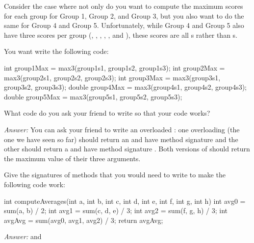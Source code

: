 \begin{example}
Consider the case where not only do you
want to compute the maximum scores for each group
for Group 1, Group 2, and Group 3, but you
also want to do the same for Group 4 and Group 5.
Unfortunately, while Group 4 and Group 5 also have
three scores per group (, ,
, , ,
and ), these scores are all s
rather than s.

You want write the following code:
\begin{code}
int group1Max = max3(group1s1, group1s2, group1s3);
int group2Max = max3(group2s1, group2s2, group2s3);
int group3Max = max3(group3s1, group3s2, group3s3);
double group4Max = max3(group4s1, group4s2, group4s3);
double group5Max = max3(group5s1, group5s2, group5s3);
\end{code}

What code do you ask your friend to write
so that your code works?

\noindent \emph{Answer:} You can ask your friend to write
an overloaded : one overloading (the one
we have seen so far) should return an
 and have method signature 
and the other should return a  and have
method signature .
Both versions of  should return the maximum value
of their three arguments.
\end{example}

\begin{example}
Give the signatures of methods that you would need to write
to make the following code work:
\begin{code}
int computeAverages(int a, int b, int c, int d, int e, int f, int g, int h) {
  int avg0 = sum(a, b) / 2;
  int avg1 = sum(c, d, e) / 3;
  int avg2 = sum(f, g, h) / 3;
  int avgAvg = sum(avg0, avg1, avg2) / 3;
  return avgAvg;
}
\end{code}

\noindent \emph{Answer:}
 and 
\end{example}

